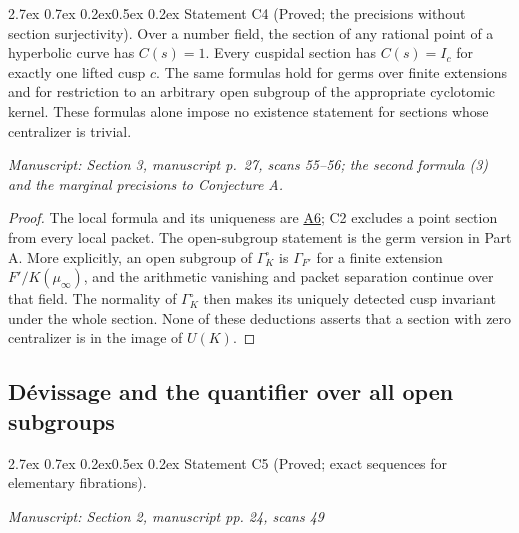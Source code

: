 \documentclass[11pt,a4paper]{article}
\makeatletter
\newcommand{\passage}[1]{\par\smallskip\noindent\textit{Manuscript: #1}\par\smallskip}
\newcommand{\resref}[1]{\hyperref[res:#1]{#1}}
\newcommand{\Rtwo}{\resref{A6}}
\renewcommand\paragraph{\@startsection{paragraph}{4}{\z@}%
  {2.7ex \@plus 0.7ex \@minus 0.2ex}{0.5ex \@plus 0.2ex}%
  {\normalfont\normalsize\bfseries}}
\makeatother
\begin{document}
\paragraph{Statement C4 (Proved; the precisions without section surjectivity).}\label{res:C4}
Over a number field, the section of any rational point of a hyperbolic curve has $C(s)=1$. Every cuspidal section has $C(s)=I_c$ for exactly one lifted cusp $c$. The same formulas hold for germs over finite extensions and for restriction to an arbitrary open subgroup of the appropriate cyclotomic kernel. These formulas alone impose no existence statement for sections whose centralizer is trivial.
\passage{Section 3, manuscript p.~27, scans 55--56; the second formula (3) and the marginal precisions to Conjecture A.}
\begin{proof}
The local formula and its uniqueness are \Rtwo; C2 excludes a point section from every local packet. The open-subgroup statement is the germ version in Part A. More explicitly, an open subgroup of $\Gamma_K^\circ$ is $\Gamma_{F'}$ for a finite extension $F'/K(\mu_\infty)$, and the arithmetic vanishing and packet separation continue over that field. The normality of $\Gamma_K^\circ$ then makes its uniquely detected cusp invariant under the whole section. None of these deductions asserts that a section with zero centralizer is in the image of $U(K)$.
\end{proof}

\subsection{Dévissage and the quantifier over all open subgroups}

\paragraph{Statement C5 (Proved; exact sequences for elementary fibrations).}\label{res:C5}
\passage{Section 2, manuscript pp. 24, scans 49}
\end{document}
